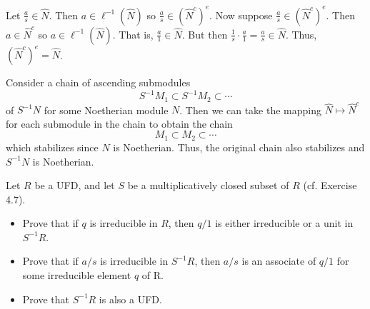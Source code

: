 \documentclass[../../master.tex]{subfiles}
\begin{document}
    \begin{solution}
        Let $\frac{a}{s} \in \hat{N}$. Then $a \in \ell^{-1}(\hat{N})$ so
        $\frac{a}{s} \in (\hat{N}^{c})^{e}$. Now suppose $\frac{a}{s} \in
        (\hat{N}^{c})^{e}$. Then $a \in \hat{N}^{c}$ so $a \in
        \ell^{-1}(\hat{N})$. That is, $\frac{a}{1} \in \hat{N}$. But then
        $\frac{1}{s} \cdot \frac{a}{1} = \frac{a}{s} \in \hat{N}$. Thus,
        $(\hat{N}^{c})^{e} = \hat{N}$.

        Consider a chain of ascending submodules
        \[
        S^{-1}M_1 \subset S^{-1}M_2 \subset \cdots
        \]  
        of $S^{-1}N$ for some Noetherian module $N$. Then we can take the
        mapping $\hat{N} \mapsto \hat{N}^{c}$ for each submodule in the chain to
        obtain the chain
        \[
        M_1 \subset M_2 \subset \cdots
        \] 
        which stabilizes since $N$ is Noetherian. Thus, the original chain also
        stabilizes and $S^{-1}N$ is Noetherian.
    \end{solution}

    \begin{problem}
        Let $R$ be a UFD, and let $S$ be a multiplicatively closed subset of
        $R$ (cf. Exercise 4.7).
        \begin{itemize}
            \item Prove that if $q$ is irreducible in $R$, then $q / 1$ is
                either irreducible or a unit in $S^{-1}R$.
            \item Prove that if $a / s$ is irreducible in $S^{-1}R$, then $a /
                s$ is an associate of $q / 1$ for some irreducible element $q$
                of R.
            \item Prove that $S^{-1}R$ is also a UFD.
        \end{itemize}
    \end{problem}
\end{document}
